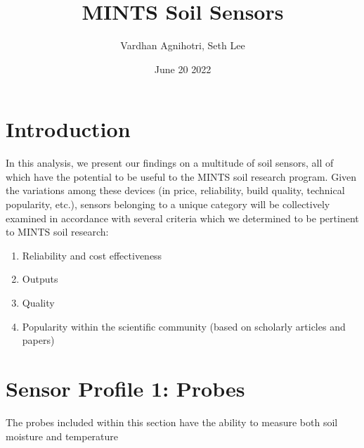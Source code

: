 \documentclass{article}
\title{MINTS Soil Sensors}
\author{Vardhan Agnihotri, Seth Lee}
\date{June 20 2022}
\begin{document}
\maketitle

\section{Introduction}
In this analysis, we present our findings on a multitude of soil sensors, all of which have the potential to be useful to the MINTS soil research program. Given the variations among these devices (in price, reliability, build quality, technical popularity, etc.), sensors belonging to a unique category will be collectively examined in accordance with several criteria which we determined to be pertinent to MINTS soil research:
\begin{enumerate}
    \item Reliability and cost effectiveness
    \item Outputs
    \item Quality %
    \item Popularity within the scientific community (based on scholarly articles and papers)
\end{enumerate}


\section{Sensor Profile 1: Probes}
The probes included within this section have the ability to measure both soil moisture and temperature
\end{document}
